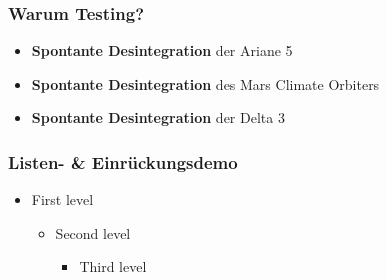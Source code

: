\documentclass[t]{beamer}
\begin{document}
\begin{frame}
  \frametitle{Warum Testing?}
  \begin{itemize}
    \item \textbf{Spontante Desintegration} der Ariane 5
    \item \textbf{Spontante Desintegration} des Mars Climate Orbiters
    \item \textbf{Spontante Desintegration} der Delta 3
  \end{itemize}
\end{frame}

\begin{frame}
  \frametitle{Listen- & Einrückungsdemo}
  \begin{itemize}
    \item First level
    \begin{itemize}
      \item Second level
      \begin{itemize}
        \item Third level
      \end{itemize}
    \end{itemize}
  \end{itemize}
\end{frame}

\end{document}
